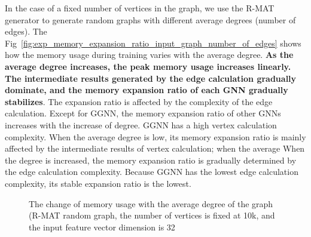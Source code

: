 In the case of a fixed number of vertices in the graph, we use the R-MAT generator to generate random graphs with different average degrees (number of edges).
The Fig~\ref{fig:exp_memory_expansion_ratio_input_graph_number_of_edges} shows how the memory usage during training varies with the average degree.
\textbf{As the average degree increases, the peak memory usage increases linearly.
The intermediate results generated by the edge calculation gradually dominate, and the memory expansion ratio of each GNN gradually stabilizes}. 
The expansion ratio is affected by the complexity of the edge calculation.
Except for GGNN, the memory expansion ratio of other GNNs increases with the increase of degree. GGNN has a high vertex calculation complexity.
When the average degree is low, its memory expansion ratio is mainly affected by the intermediate results of vertex calculation;
when the average When the degree is increased, the memory expansion ratio is gradually determined by the edge calculation complexity.
Because GGNN has the lowest edge calculation complexity, its stable expansion ratio is the lowest.

\begin{figure}
    \centering
    \caption{The change of memory usage with the average degree of the graph (R-MAT random graph, the number of vertices is fixed at 10k, and the input feature vector dimension is 32}
    \label{fig:exp_memory_expension_ratio_input_feature_dimension}
\end{figure}

